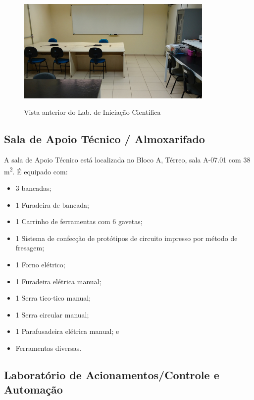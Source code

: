 \begin{figure}[!htb]
    \centering
    \caption{Vista anterior do Lab. de Iniciação Científica}
    \includegraphics[width=0.85\textwidth]{Caps/Figs/lab007.01c.png}
    \fonte{\utf}
    \label{fig:lab007.01c}
\end{figure}

\subsection{Sala de Apoio Técnico / Almoxarifado}

A sala de Apoio Técnico está localizada no Bloco A, Térreo, sala A-07.01 com 38 m\textsuperscript{2}. É equipado com:

\begin{itemize}
    \item 3 bancadas; 
    \item 1 Furadeira de bancada; 
    \item 1 Carrinho de ferramentas com 6 gavetas; 
    \item 1 Sistema de confecção de protótipos de circuito impresso por método de fresagem; 
    \item 1 Forno elétrico; 
    \item 1 Furadeira elétrica manual; 
    \item 1 Serra tico-tico manual; 
    \item 1 Serra circular manual; 
    \item 1 Parafusadeira elétrica manual; e
    \item Ferramentas diversas.    
\end{itemize}



\subsection{Laboratório de Acionamentos/Controle e Automação}

